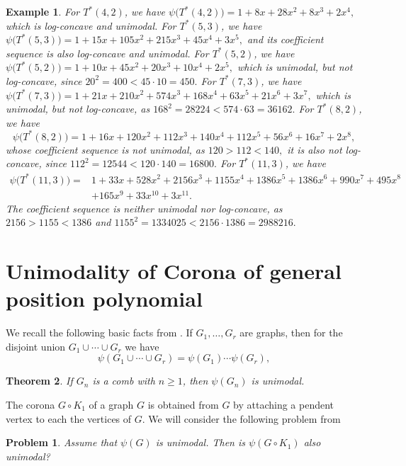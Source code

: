 \documentclass[12pt,twoside]{article}
\newtheorem{theorem}{Theorem}[section]
\newtheorem{example}[theorem]{Example}
\newtheorem{problem}{Problem}
\begin{document}
		\begin{example}
			  For $T^*(4,2)$, we have $	\psi\bigl(T^*(4,2)\bigr)=1+8x+28x^2+8x^3+2x^4,$ which is log-concave and unimodal.
				 For $T^*(5,3)$, we have  $\psi\bigl(T^*(5,3)\bigr)=1+15x+105x^2+215x^3+45x^4+3x^5,$ and  its coefficient sequence is also log-concave and unimodal. For $T^*(5,2)$, we have $\psi\bigl(T^*(5,2)\bigr)=1+10x+45x^2+20x^3+10x^4+2x^5, $  which is unimodal, but not log-concave, since $20^2=400<45\cdot 10=450.$  For $T^*(7,3)$, we have  $
				\psi\bigl(T^*(7,3)\bigr)=1+21x+210x^2+574x^3+168x^4+63x^5+21x^6+3x^7,$  which  is unimodal, but not log-concave,  as $168^2=28224<574\cdot 63=36162.$ For $T^*(8,2)$, we have
				$$
				\psi\bigl(T^*(8,2)\bigr)=1+16x+120x^2+112x^3+140x^4+112x^5+56x^6+16x^7+2x^8,
				$$
				whose coefficient sequence is not unimodal, as  $120>112<140,$  it is also not log-concave, since $112^2=12544<120\cdot 140=16800.$  For $T^*(11,3)$, we have
				\begin{align*}
				 \psi\bigl(T^*(11,3)\bigr) =&1+33x+528x^2+2156x^3+1155x^4+1386x^5+1386x^6+990x^7+495x^8\\
				 &+165x^9+33x^{10}+3x^{11}.
				\end{align*}
				The coefficient sequence is neither unimodal nor log-concave, as  $2156>1155<1386$ and $1155^2=1334025<2156\cdot 1386=2988216.$
		\end{example}
	
	\section{Unimodality of Corona of general position polynomial}\label{section 6}
	
	We recall the following basic facts from \cite{0}.
	  If $G_1,\dots,G_r$ are graphs, then for the disjoint union
		$G_1\cup\cdots\cup G_r$ we have
		\[
		\psi(G_1\cup\cdots\cup G_r)=\psi(G_1)\cdots\psi(G_r),
		\]		
		\begin{theorem}\rm \cite[Theorem~4.1]{0}
			If $G_n$ is a comb with $n\ge 1$, then $\psi(G_n)$ is unimodal.
		\end{theorem} 
	The corona \( G \circ K_1 \) of a graph \( G \) is obtained from \( G \) by attaching a pendent vertex to each the vertices of \( G \).
	We will consider the following problem from \cite[Problem 5.1]{0}
	\begin{problem}\label{problem 1}
		Assume that \( \psi(G) \) is unimodal. Then is \( \psi(G \circ K_1) \) also unimodal?
	\end{problem}
	
\end{document}
